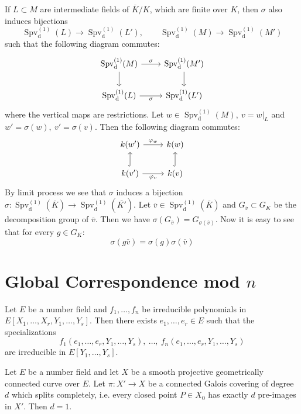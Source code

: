 \begin{remark}\label{3.3}
If $L\subset M$ are intermediate fields of $\overline{K}/K$, which are finite over $K$, then $\sigma$ also induces bijections
\[ \operatorname{Spv}_\text{d}^{(1)}(L) \to \operatorname{Spv}_\text{d}^{(1)}(L'),\qquad \operatorname{Spv}_\text{d}^{(1)}(M) \to \operatorname{Spv}_\text{d}^{(1)}(M') \]
such that the following diagram commutes:
\[\begin{tikzcd}
\operatorname{Spv}_\text{d}^{(1)}(M) \rar["\sigma"]\dar & \operatorname{Spv}_\text{d}^{(1)}(M')\dar\\
\operatorname{Spv}_\text{d}^{(1)}(L) \rar["\sigma"'] & \operatorname{Spv}_\text{d}^{(1)}(L')
\end{tikzcd}\]
where the vertical maps are restrictions. Let $w\in\operatorname{Spv}_\text{d}^{(1)}(M),\ v=w|_L$ and $w'=\sigma(w),\ v'=\sigma(v)$. Then the following diagram commutes:
\[ \begin{tikzcd}
k(w') \rar["\varphi_w"] & k(w)\\
k(v') \rar["\varphi_v"']\uar[hook] & k(v)\uar[hook]
\end{tikzcd} \]
By limit process we see that $\sigma$ induces a bijection $\sigma: \operatorname{Spv}_\text{d}^{(1)}(\overline{K})\to \operatorname{Spv}_\text{d}^{(1)}(\overline{K'})$. Let $\overline{v}\in \operatorname{Spv}_\text{d}^{(1)}(\overline{K})$ and $G_{\overline{v}}\subset G_K$ be the decomposition group of $\overline{v}$. Then we have $\sigma(G_{\overline{v}}) = G_{\sigma(\overline{v})}$. Now it is easy to see that for every $g\in G_K$:
\[ \sigma(g\overline{v}) = \sigma(g)\sigma(\overline{v}) \]
\end{remark}

\section{Global Correspondence mod $n$}

\begin{theorem}\label{hilberts-irreducibility-theorem}
Let $E$ be a number field and $f_1,\ldots, f_n$ be irreducible polynomials in $E[X_1,\ldots,X_r,Y_1,\ldots,Y_s]$. Then there exists $e_1,\ldots,e_r\in E$ such that the specializations
\[ f_1(e_1,\ldots,e_r,Y_1,\ldots,Y_s),\ \ldots,\ f_n(e_1,\ldots,e_r,Y_1,\ldots,Y_s) \]
are irreducible in $E[Y_1,\ldots,Y_s]$.
\end{theorem}

\begin{lemma}\label{4.1}
Let $E$ be a number field and let $X$ be a smooth projective geometrically connected curve over $E$. Let $\pi:X'\to X$ be a connected Galois covering of degree $d$ which splits completely, i.e. every closed point $P\in X_0$ has exactly $d$ pre-images in $X'$. Then $d=1$.
\end{lemma}

